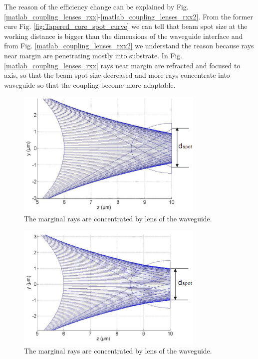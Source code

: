  
The reason of the efficiency change can be explained by Fig.  \ref{matlab_coupling_lenses_rxx}-\ref{matlab_coupling_lenses_rxx2}. From the former cure Fig. \ref{fig:Tapered_core_spot_curve} we can tell that beam spot size at the working distance is bigger than the dimensions of the waveguide interface and from Fig. \ref{matlab_coupling_lenses_rxx2} we understand the reason because rays near margin are penetrating mostly into substrate. In Fig. \ref{matlab_coupling_lenses_rxx} rays near margin are refracted and focused to axis, so that the beam spot size decreased and more rays concentrate into waveguide so that the coupling become more adaptable.   
\begin{figure}[!ht]
\includegraphics[width=0.8\textwidth]{bilder/beam_ray_without_refract}
\caption{The marginal rays are concentrated by lens of the waveguide.}
\label{fig:matlab_coupling_lenses_rxx}
\end{figure}
\begin{figure}[!ht]
\includegraphics[width=0.8\textwidth]{bilder/beam_ray_refract}
\caption{The marginal rays are concentrated by lens of the waveguide.}
\label{fig:matlab_coupling_lenses_rxx2}
\end{figure}
